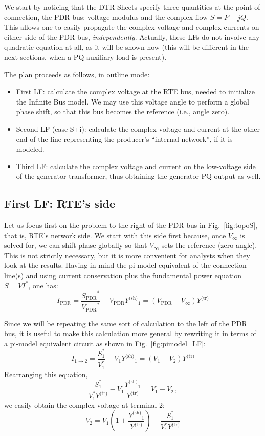 \documentclass[a4paper,11pt]{article}
\newcommand{\Vpdr}{\ensuremath{V_{\textrm{PDR}}}}
\newcommand{\Ipdr}{\ensuremath{I_{\textrm{PDR}}}}
\newcommand{\Spdr}{\ensuremath{S_{\textrm{PDR}}}}
\newcommand{\Ytr}{\ensuremath{Y^{\textrm{(tr)}}}}
\newcommand{\Ysh}{\ensuremath{Y^{\textrm{(sh)}}}}
\begin{document}
We start by noticing that the DTR Sheets specify three quantities at the point of
connection, the PDR bus: voltage modulus and the complex flow $S=P+jQ$. This allows one
to easily propagate the complex voltage and complex currents on either side of the PDR
bus, \emph{independently}. Actually, these LFs do not involve any quadratic equation at
all, as it will be shown now (this will be different in the next sections, when a PQ
auxiliary load is present).

The plan proceeds as follows, in outline mode:
\begin{itemize}
\item First LF: calculate the complex voltage at the RTE bus, needed to initialize the
  Infinite Bus model. We may use this voltage angle to perform a global phase shift, so
  that this bus becomes the reference (i.e., angle zero).
\item Second LF (case S+i): calculate the complex voltage and current at the other end
  of the line representing the producer's ``internal network'', if it is modeled.
\item Third LF: calculate the complex voltage and current on the low-voltage side of the
  generator transformer, thus obtaining the generator PQ output as well.
\end{itemize}



\subsection{First LF: RTE's side}
Let us focus first on the problem to the right of the PDR bus in Fig.~\ref{fig:topoS},
that is, RTE's network side. We start with this side first because, once $V_\infty$ is
solved for, we can shift phase globally so that $V_\infty$ sets the reference (zero
angle).  This is not strictly necessary, but it is more convenient for analysts when
they look at the results. Having in mind the pi-model equivalent of the connection
line(s) and using current conservation plus the fundamental power equation $S=VI^*$, one
has:
\begin{equation*}
  \Ipdr = \frac{\Spdr^*}{\Vpdr^*} - \Vpdr \Ysh_1
        = ( \Vpdr - V_\infty ) \Ytr
\end{equation*}

Since we will be repeating the same sort of calculation to the left of the PDR
bus, it is useful to make this calculation more general by rewriting it in terms
of a pi-model equivalent circuit as shown in Fig.~\ref{fig:pimodel_LF}:
\begin{equation*}
  I_{1\rightarrow 2} = \frac{S_1^*}{V_1^*} - V_1 \Ysh_1
                     = ( V_1 - V_2 ) \Ytr
\end{equation*}
Rearranging this equation,
\begin{equation*}
  \frac{S_1^*}{V_1^* \Ytr} - V_1 \frac{\Ysh_1}{\Ytr}
  = V_1 - V_2 \,, 
\end{equation*}
we easily obtain the complex voltage at terminal 2:
\begin{equation}
  V_2 = V_1 \left(1 + \frac{\Ysh_1}{\Ytr} \right) - \frac{S_1^*}{V_1^* \Ytr}
  \label{eq:complex_V}
\end{equation}
\end{document}

